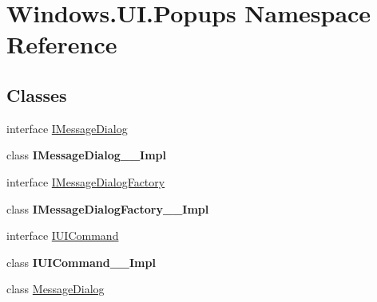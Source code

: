 \hypertarget{namespace_windows_1_1_u_i_1_1_popups}{}\section{Windows.\+U\+I.\+Popups Namespace Reference}
\label{namespace_windows_1_1_u_i_1_1_popups}
\subsection*{Classes}
\begin{DoxyCompactItemize}
\item 
interface \hyperlink{interface_windows_1_1_u_i_1_1_popups_1_1_i_message_dialog}{I\+Message\+Dialog}
\item 
class {\bfseries I\+Message\+Dialog\+\_\+\+\_\+\+Impl}
\item 
interface \hyperlink{interface_windows_1_1_u_i_1_1_popups_1_1_i_message_dialog_factory}{I\+Message\+Dialog\+Factory}
\item 
class {\bfseries I\+Message\+Dialog\+Factory\+\_\+\+\_\+\+Impl}
\item 
interface \hyperlink{interface_windows_1_1_u_i_1_1_popups_1_1_i_u_i_command}{I\+U\+I\+Command}
\item 
class {\bfseries I\+U\+I\+Command\+\_\+\+\_\+\+Impl}
\item 
class \hyperlink{class_windows_1_1_u_i_1_1_popups_1_1_message_dialog}{Message\+Dialog}
\end{DoxyCompactItemize}
